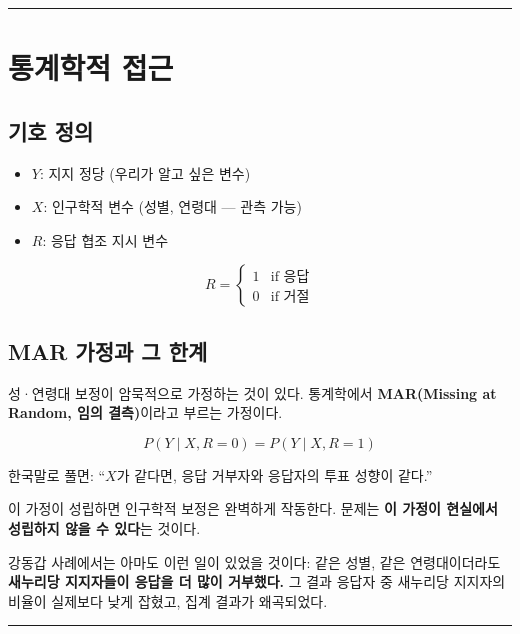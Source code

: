 \documentclass[
  letterpaper,
  DIV=11,
  numbers=noendperiod]{scrreprt}
\providecommand{\tightlist}{%
  \setlength{\itemsep}{0pt}\setlength{\parskip}{0pt}}
\begin{document}
\begin{center}\rule{0.5\linewidth}{0.5pt}\end{center}

\section{통계학적 접근}\label{uxd1b5uxacc4uxd559uxc801-uxc811uxadfc}

\subsection{기호 정의}\label{uxae30uxd638-uxc815uxc758}

\begin{itemize}
\tightlist
\item
  \(Y\): 지지 정당 (우리가 알고 싶은 변수)
\item
  \(X\): 인구학적 변수 (성별, 연령대 --- 관측 가능)
\item
  \(R\): 응답 협조 지시 변수
\end{itemize}

\[R = \begin{cases} 1 & \text{if 응답} \\ 0 & \text{if 거절} \end{cases}\]

\subsection{MAR 가정과 그
한계}\label{mar-uxac00uxc815uxacfc-uxadf8-uxd55cuxacc4}

성·연령대 보정이 암묵적으로 가정하는 것이 있다. 통계학에서
\textbf{MAR(Missing at Random, 임의 결측)}이라고 부르는 가정이다.

\[P(Y \mid X, R=0) = P(Y \mid X, R=1) \tag{MAR}\]

한국말로 풀면: ``\(X\)가 같다면, 응답 거부자와 응답자의 투표 성향이
같다.''

이 가정이 성립하면 인구학적 보정은 완벽하게 작동한다. 문제는 \textbf{이
가정이 현실에서 성립하지 않을 수 있다}는 것이다.

강동갑 사례에서는 아마도 이런 일이 있었을 것이다: 같은 성별, 같은
연령대이더라도 \textbf{새누리당 지지자들이 응답을 더 많이 거부했다.} 그
결과 응답자 중 새누리당 지지자의 비율이 실제보다 낮게 잡혔고, 집계
결과가 왜곡되었다.

\begin{center}\rule{0.5\linewidth}{0.5pt}\end{center}
\end{document}
